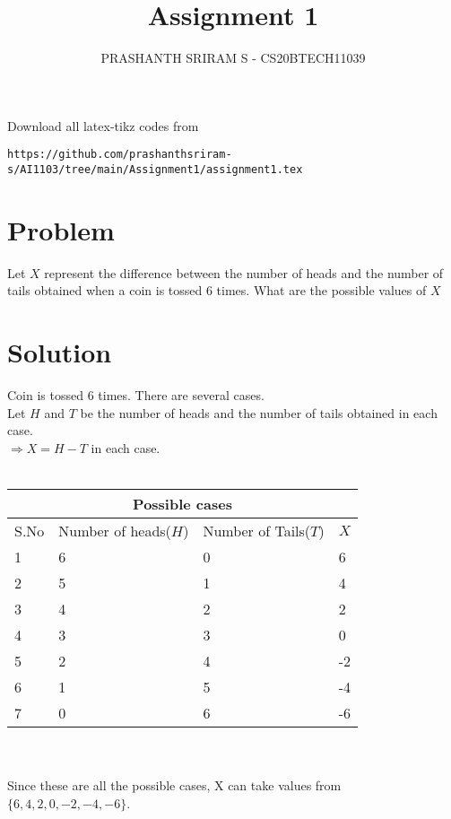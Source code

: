 \documentclass[journal,12pt,twocolumn]{IEEEtran}
\begin{document}
\title{Assignment 1}
\author{PRASHANTH SRIRAM S - CS20BTECH11039}
\maketitle
\newpage
\bigskip
\renewcommand{\thefigure}{\theenumi}
\renewcommand{\thetable}{\theenumi}
%
Download all latex-tikz codes from 
%
\begin{lstlisting}
https://github.com/prashanthsriram-s/AI1103/tree/main/Assignment1/assignment1.tex
\end{lstlisting}
\section{Problem}
Let $X$ represent the difference between the number of heads and the number of tails obtained when a coin is tossed 6 times. What are the possible values of $X$
\section{Solution} 
    Coin is tossed 6 times. There are several cases. \\
    Let $H$ and $T$ be the number of heads and the number of tails obtained in each case. \\
    $\Rightarrow X=H-T$ in each case.\\ \\
    \begin{tabular}{ |p{1.5cm}||p{1.5cm}|p{1.5cm}|p{1.5cm}|  }
 \hline
 \multicolumn{4}{|c|}{Possible cases} \\
 \hline
 S.No& Number of heads($H$)& Number of Tails($T$)&$X$\\
 \hline
 1   &6&0&6\\
 2&5&1&4\\
 3&4&2&2\\
 4&3&3&0\\
 5&2&4&-2\\
 6&1&5&-4\\
 7&0&6&-6\\
 \hline
\end{tabular} \\ \\
Since these are all the possible cases, X can take values from $\{6,4,2,0,-2,-4,-6\}$.
\end{document}
